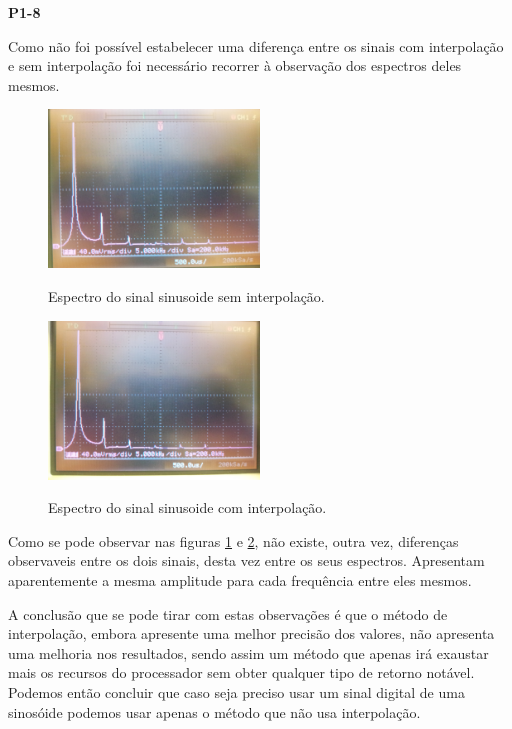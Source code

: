 \documentclass[11pt]{article}
\begin{document}
\textbf{P1-8}
\label{para:P1-8}

Como não foi possível estabelecer uma diferença entre os sinais com interpolação e sem interpolação foi necessário recorrer à observação dos espectros deles mesmos.

\begin{figure}[H]
	\centering
	\label{fig:espect_s_interp}
	\includegraphics[width=0.5\textwidth]{./P1-8_espect_s_interp}~\\
	\caption{Espectro do sinal sinusoide sem interpolação.}
\end{figure}

\begin{figure}[H]
	\centering
	\label{fig:espect_c_interp}
	\includegraphics[width=0.5\textwidth]{./P1-8_espect_c_interp}~\\
	\caption{Espectro do sinal sinusoide com interpolação.}
\end{figure}

Como se pode observar nas figuras \ref{fig:espect_s_interp} e \ref{fig:espect_c_interp}, não existe, outra vez, diferenças observaveis entre os dois sinais, desta vez entre os seus espectros. Apresentam aparentemente a mesma amplitude para cada frequência entre eles mesmos.

A conclusão que se pode tirar com estas observações é que o método de interpolação, embora apresente uma melhor precisão dos valores, não apresenta uma melhoria nos resultados, sendo assim um método que apenas irá exaustar mais os recursos do processador sem obter qualquer tipo de retorno notável. Podemos então concluir que caso seja preciso usar um sinal digital de uma sinosóide podemos usar apenas o método que não usa interpolação.
\end{document}
